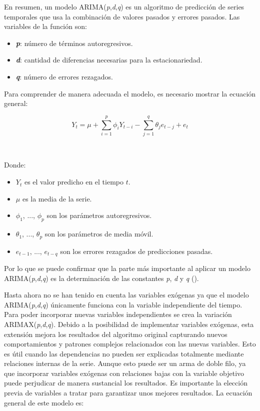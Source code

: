 \documentclass[12pt,a4paper]{report}
\begin{document}
En resumen, un modelo ARIMA(\textit{p},\textit{d},\textit{q}) es un algoritmo de predicción de series temporales que usa la combinación de valores pasados y errores pasados. Las variables de la función son:

\begin{itemize}
    \item \textbf{\textit{p}}: número de términos autoregresivos.

    \item \textbf{\textit{d}}: cantidad de diferencias necesarias para la estacionariedad.

    \item \textbf{\textit{q}}: número de errores rezagados.
\end{itemize}

Para comprender de manera adecuada el modelo, es necesario mostrar la ecuación general:

\begin{equation*}
    Y_t = \mu + \sum_{i=1}^{p} \phi_i Y_{t-i} - \sum_{j=1}^{q} \theta_j e_{t-j} + e_t
\end{equation*}

\

Donde:

\begin{itemize}
    \item $Y_t$ es el valor predicho en el tiempo $t$.

    \item $\mu$ es la media de la serie.

    \item $\phi_1$, ..., $\phi_p$ son los parámetros autoregresivos.

    \item $\theta_1$, ..., $\theta_p$ son los parámetros de media móvil.

    \item $e_{t-1}$, ..., $e_{t-q}$ son los errores rezagados de predicciones pasadas.
\end{itemize}

Por lo que se puede confirmar que la parte más importante al aplicar un modelo ARIMA(\textit{p},\textit{d},\textit{q}) es la determinación de las constantes \textit{p}, \textit{d} y \textit{q} (\cite{nau2024}).

Hasta ahora no se han tenido en cuenta las variables exógenas ya que el modelo ARIMA(\textit{p},\textit{d},\textit{q}) únicamente funciona con la variable independiente del tiempo. Para poder incorporar nuevas variables independientes se crea la variación ARIMAX(\textit{p},\textit{d},\textit{q}). Debido a la posibilidad de implementar variables exógenas, esta extensión mejora los resultados del algoritmo original capturando nuevos comportamientos y patrones complejos relacionados con las nuevas variables. Esto es útil cuando las dependencias no pueden ser explicadas totalmente mediante relaciones internas de la serie. Aunque esto puede ser un arma de doble filo, ya que incorporar variables exógenas con relaciones bajas con la variable objetivo puede perjudicar de manera sustancial los resultados. Es importante la elección previa de variables a tratar para garantizar unos mejores resultados. La ecuación general de este modelo es:
\end{document}
